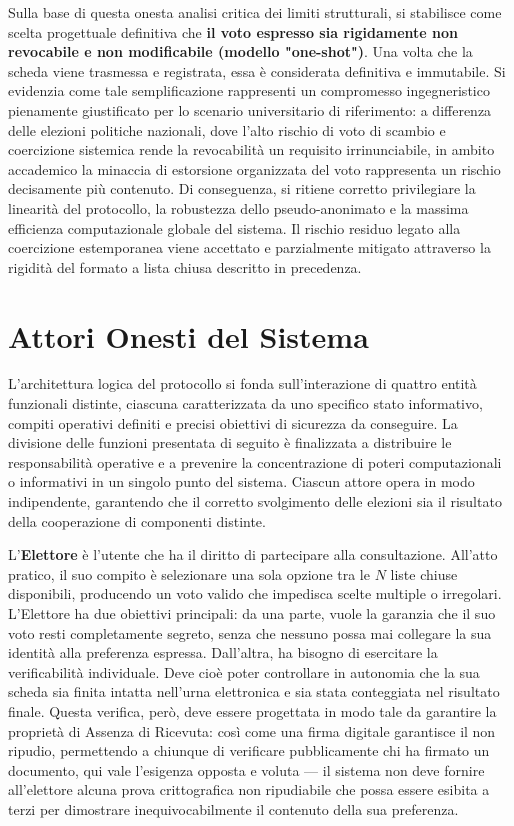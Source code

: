 \noindent
Sulla base di questa onesta analisi critica dei limiti strutturali, si stabilisce come scelta progettuale definitiva che \textbf{il voto espresso sia rigidamente non revocabile e non modificabile (modello "one-shot")}. Una volta che la scheda viene trasmessa e registrata, essa è considerata definitiva e immutabile. Si evidenzia come tale semplificazione rappresenti un compromesso ingegneristico pienamente giustificato per lo scenario universitario di riferimento: a differenza delle elezioni politiche nazionali, dove l'alto rischio di voto di scambio e coercizione sistemica rende la revocabilità un requisito irrinunciabile, in ambito accademico la minaccia di estorsione organizzata del voto rappresenta un rischio decisamente più contenuto. Di conseguenza, si ritiene corretto privilegiare la linearità del protocollo, la robustezza dello pseudo-anonimato e la massima efficienza computazionale globale del sistema. Il rischio residuo legato alla coercizione estemporanea viene accettato e parzialmente mitigato attraverso la rigidità del formato a lista chiusa descritto in precedenza.


\section{Attori Onesti del Sistema}
\label{sec:1.3_attori_onesti}

L'architettura logica del protocollo si fonda sull'interazione di quattro entità funzionali distinte, ciascuna caratterizzata da uno specifico stato informativo, compiti operativi definiti e precisi obiettivi di sicurezza da conseguire. La divisione delle funzioni presentata di seguito è finalizzata a distribuire le responsabilità operative e a prevenire la concentrazione di poteri computazionali o informativi in un singolo punto del sistema. Ciascun attore opera in modo indipendente, garantendo che il corretto svolgimento delle elezioni sia il risultato della cooperazione di componenti distinte.

L'\textbf{Elettore} è l'utente che ha il diritto di partecipare alla consultazione. All'atto pratico, il suo compito è selezionare una sola opzione tra le $N$ liste chiuse disponibili, producendo un voto valido che impedisca scelte multiple o irregolari. L'Elettore ha due obiettivi principali: da una parte, vuole la garanzia che il suo voto resti completamente segreto, senza che nessuno possa mai collegare la sua identità alla preferenza espressa. Dall'altra, ha bisogno di esercitare la verificabilità individuale. Deve cioè poter controllare in autonomia che la sua scheda sia finita intatta nell'urna elettronica e sia stata conteggiata nel risultato finale. Questa verifica, però, deve essere progettata in modo tale da garantire la proprietà di Assenza di Ricevuta: così come una firma digitale garantisce il non ripudio, permettendo a chiunque di verificare pubblicamente chi ha firmato un documento, qui vale l'esigenza opposta e voluta — il sistema non deve fornire all'elettore alcuna prova crittografica non ripudiabile che possa essere esibita a terzi per dimostrare inequivocabilmente il contenuto della sua preferenza.

